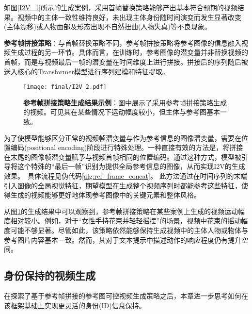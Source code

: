 如图\ref{I2V_1}所示的生成案例，采用首帧替换策略能够产出基本符合预期的视频结果。视频中的主体一致性维持良好，未出现主体身份随时间演变而发生显著改变(主体漂移)或人物面部及形态出现不自然扭曲(人物失真)等不良现象。

\textbf{参考帧拼接策略}：与首帧替换策略不同，参考帧拼接策略将参考图像的信息融入视频生成过程的另一环节。具体而言，在训练时，参考图像的潜变量并非替换视频的首帧，而是与视频最后一帧的潜变量在时间维度上进行拼接。拼接后的序列随后被送入核心的Transformer模型进行序列建模和特征提取。


\begin{figure}[htbp]
\centering
\texttt{[image: final/I2V\_2.pdf]}
\caption{\textbf{参考帧拼接策略生成结果示例}：图中展示了采用参考帧拼接策略生成的视频。可见其在某些情况下运动幅度较小，但主体与参考图基本一致。}
\label{I2V_2}
\end{figure}
为了使模型能够区分正常的视频帧潜变量与作为参考信息的图像潜变量，需要在位置编码(positional encoding)阶段进行特殊处理。一种直接有效的方法是，将拼接在末尾的图像帧潜变量赋予与视频首帧相同的位置编码。通过这种方式，模型被引导将这个特殊的“最后一帧”识别为提供全局参考信息的图像，从而实现I2V的生成效果。\ 具体流程见伪代码\ref{alg:ref_frame_concat}。
此方法通过在时间序列的末端引入图像的全局视觉特征，期望模型在生成整个视频序列时都能参考这些特征，使得生成的视频能够更好地体现参考图像中的关键元素和整体风格。


从图\ref{I2V_2}的生成结果中可以观察到，参考帧拼接策略在某些案例上生成的视频运动幅度相对较小。例如，对于“女性手持花束并轻轻摇摆”的场景，视频中花束的摇动幅度可能不够显著。尽管如此，该策略依然能够保持生成视频中的主体人物或物体与参考图片内容基本一致。然而，其对于文本提示中描述动作的响应程度仍有提升空间。\\

\subsection{身份保持的视频生成}\label{sec2}

在探索了基于参考帧拼接的参考图可控视频生成策略之后，本章进一步思考如何在该框架基础上实现更灵活的身份(ID)信息保持。

